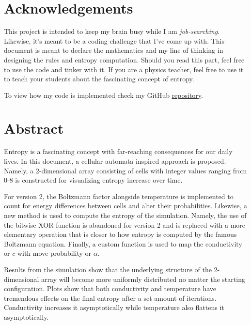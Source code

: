 \documentclass[12pt]{report}
\begin{document}


\chapter*{Acknowledgements}
This project is intended to keep my brain busy while I am 
\emph{job-searching}. Likewise, it's meant to be a coding challenge that I've come up with. This document is meant to declare the mathematics and my line of thinking in designing the rules and entropy computation. Should you read this part, feel free to use the code and tinker with it. If you are a physics teacher, feel free to use it to teach your students about the fascinating concept of entropy.   \par

\vspace{0.3cm}
To view how my code is implemented check my GitHub \href{https://github.com/ShiroHusin/Entropy_Simulation}{repository}.


\chapter*{Abstract}
Entropy is a fascinating concept with far-reaching consequences for our daily lives. In this document, a cellular-automata-inspired approach is proposed. Namely, a 2-dimensional array consisting of cells with integer values ranging from 0-8 is constructed for visualizing  entropy increase over time. \par

\vspace{0.3cm}
\noindent
For version 2, the Boltzmann factor alongside temperature is implemented to count for energy differences between cells and alter their probabilities. Likewise, a new method is used to compute the entropy of the simulation. Namely, the use of the bitwise XOR function is abandoned for version 2 and is replaced with a more elementary operation that is closer to how entropy is computed by the famous Boltzmann equation. Finally, a custom function is used to map the conductivity or $c$ with move probability or $\alpha$. \par

\vspace{0.3cm}
\noindent
Results from the simulation show that the underlying structure of the 2-dimensional array will become more uniformly distributed no matter the starting configuration. Plots show that both conductivity and temperature have tremendous effects on the final entropy after a set amount of iterations. Conductivity increases it asymptotically while temperature also flattens it asymptotically.  \par



\tableofcontents

\pagebreak









\pagebreak

\end{document}
